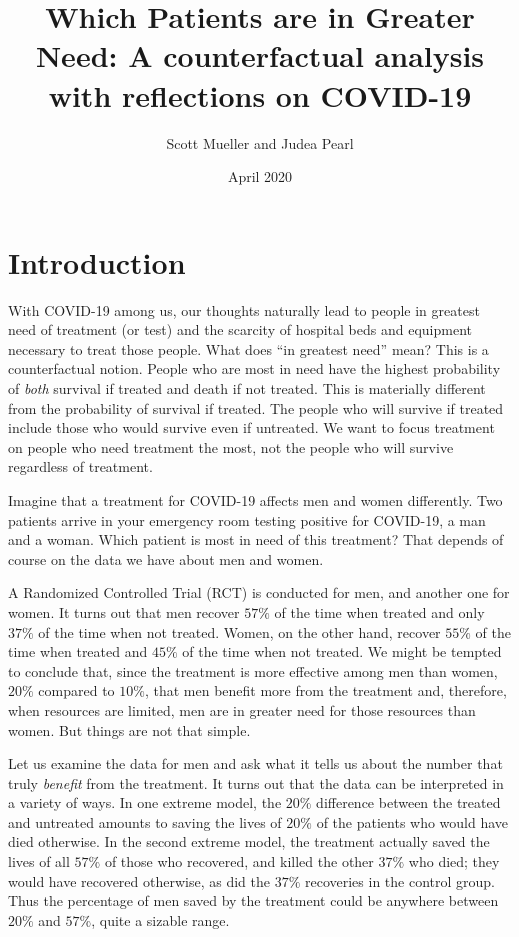 \documentclass{article}
\title{Which Patients are in Greater Need: A counterfactual analysis with reflections on COVID-19}
\author{Scott Mueller and Judea Pearl}
\date{April 2020}
\begin{document}
\maketitle

\section{Introduction}
With COVID-19 among us, our thoughts naturally lead to people in greatest need of treatment (or test) and the scarcity of hospital beds and equipment necessary to treat those people. What does ``in greatest need'' mean? This is a counterfactual notion. People who are most in need have the highest probability of \emph{both} survival if treated and death if not treated. This is materially different from the probability of survival if treated. The people who will survive if treated include those who would survive even if untreated. We want to focus treatment on people who need treatment the most, not the people who will survive regardless of treatment.

Imagine that a treatment for COVID-19 affects men and women differently. Two patients arrive in your emergency room testing positive for COVID-19, a man and a woman. Which patient is most in need of this treatment? That depends of course on the data we have about men and women.

A Randomized Controlled Trial (RCT) is conducted for men, and another one for women. It turns out that men recover $57\%$ of the time when treated and only $37\%$ of the time when not treated. Women, on the other hand, recover $55\%$ of the time when treated and $45\%$ of the time when not treated. We might be tempted to conclude that, since the treatment is more effective among men than women, $20\%$ compared to $10\%$, that men benefit more from the treatment and, therefore, when resources are limited, men are in greater need for those resources than women. But things are not that simple.

Let us examine the data for men and ask what it tells us about the number that truly \emph{benefit} from the treatment. It turns out that the data can be interpreted in a variety of ways. In one extreme model, the $20\%$ difference between the treated and untreated amounts to saving the lives of $20\%$ of the patients who would have died otherwise. In the second extreme model, the treatment actually saved the lives of all $57\%$ of those who recovered, and killed the other $37\%$ who died; they would have recovered otherwise, as did the $37\%$ recoveries in the control group. Thus the percentage of men saved by the treatment could be anywhere between $20\%$ and $57\%$, quite a sizable range.
\end{document}
